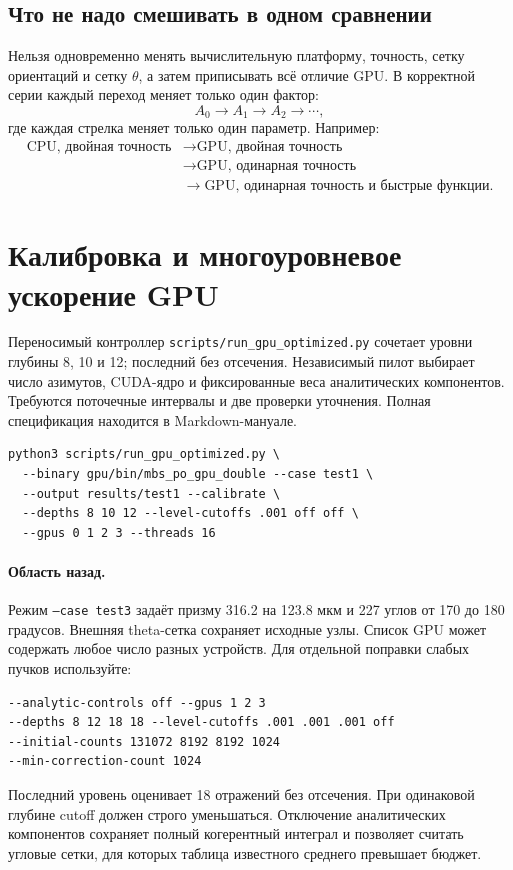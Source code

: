 \documentclass[11pt,a4paper]{article}
\begin{document}
\subsection{Что не надо смешивать в одном сравнении}

Нельзя одновременно менять вычислительную платформу, точность, сетку
ориентаций и сетку $\theta$, а затем приписывать всё отличие GPU. В корректной
серии каждый переход меняет только один фактор:
\[
  A_0 \to A_1 \to A_2 \to \cdots,
\]
где каждая стрелка меняет только один параметр. Например:
\begin{align*}
  \text{CPU, двойная точность}
  &\longrightarrow \text{GPU, двойная точность} \\
  &\longrightarrow \text{GPU, одинарная точность} \\
  &\longrightarrow \text{GPU, одинарная точность и быстрые функции}.
\end{align*}

\section{Калибровка и многоуровневое ускорение GPU}
Переносимый контроллер \texttt{scripts/run\_gpu\_optimized.py} сочетает уровни глубины 8, 10 и 12; последний без отсечения. Независимый пилот выбирает число азимутов, CUDA-ядро и фиксированные веса аналитических компонентов. Требуются поточечные интервалы и две проверки уточнения. Полная спецификация находится в Markdown-мануале.
\begin{verbatim}
python3 scripts/run_gpu_optimized.py \
  --binary gpu/bin/mbs_po_gpu_double --case test1 \
  --output results/test1 --calibrate \
  --depths 8 10 12 --level-cutoffs .001 off off \
  --gpus 0 1 2 3 --threads 16
\end{verbatim}
\paragraph{Область назад.}
Режим \texttt{--case test3} задаёт призму 316.2 на 123.8 мкм и 227 углов от
170 до 180 градусов. Внешняя theta-сетка сохраняет исходные узлы.
Список GPU может содержать любое число разных устройств.
Для отдельной поправки слабых пучков используйте:
\begin{verbatim}
--analytic-controls off --gpus 1 2 3
--depths 8 12 18 18 --level-cutoffs .001 .001 .001 off
--initial-counts 131072 8192 8192 1024
--min-correction-count 1024
\end{verbatim}
Последний уровень оценивает 18 отражений без отсечения. При одинаковой
глубине cutoff должен строго уменьшаться. Отключение аналитических
компонентов сохраняет полный когерентный интеграл и позволяет считать
угловые сетки, для которых таблица известного среднего превышает бюджет.
\end{document}

